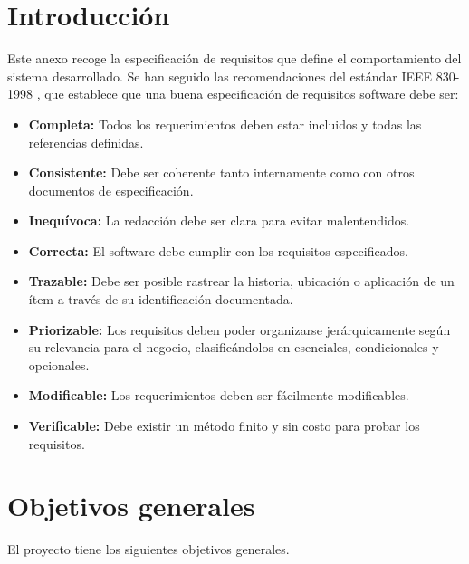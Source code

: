 
\section{Introducción}\label{intoduccion-requisitos}

Este anexo recoge la especificación de requisitos que define el comportamiento del sistema desarrollado. Se han seguido las recomendaciones del estándar IEEE 830-1998 \cite{ieee}, que establece que una buena especificación de requisitos software debe ser:

\begin{itemize}
    \item \textbf{Completa:} Todos los requerimientos deben estar incluidos y todas las referencias definidas.
    \item \textbf{Consistente:} Debe ser coherente tanto internamente como con otros documentos de especificación.
    \item \textbf{Inequívoca:} La redacción debe ser clara para evitar malentendidos.
    \item \textbf{Correcta:} El software debe cumplir con los requisitos especificados.
    \item \textbf{Trazable:} Debe ser posible rastrear la historia, ubicación o aplicación de un ítem a través de su identificación documentada.
    \item \textbf{Priorizable:} Los requisitos deben poder organizarse jerárquicamente según su relevancia para el negocio, clasificándolos en esenciales, condicionales y opcionales.
    \item \textbf{Modificable:} Los requerimientos deben ser fácilmente modificables.
    \item \textbf{Verificable:} Debe existir un método finito y sin costo para probar los requisitos.
\end{itemize}

\section{Objetivos generales}\label{objetivos-generales}

El proyecto tiene los siguientes objetivos generales.

